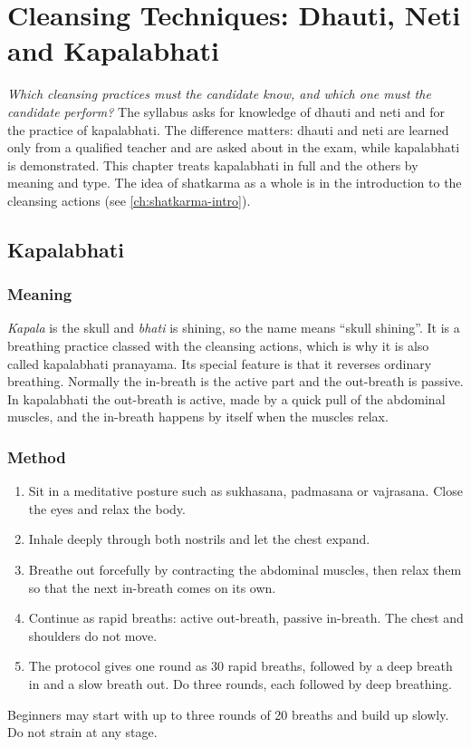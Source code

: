 \chapter{Cleansing Techniques: Dhauti, Neti and Kapalabhati}
\label{ch:cleansing}

\emph{Which cleansing practices must the candidate know, and which one must the candidate perform?}
The syllabus asks for knowledge of dhauti and neti and for the practice of kapalabhati. The difference matters: dhauti and neti are learned only from a qualified teacher and are asked about in the exam, while kapalabhati is demonstrated. This chapter treats kapalabhati in full and the others by meaning and type. The idea of shatkarma as a whole is in the introduction to the cleansing actions (see \cref{ch:shatkarma-intro}).

\section{Kapalabhati}

\subsection*{Meaning}
\emph{Kapala} is the skull and \emph{bhati} is shining, so the name means ``skull shining''. It is a breathing practice classed with the cleansing actions, which is why it is also called kapalabhati pranayama. Its special feature is that it reverses ordinary breathing. Normally the in-breath is the active part and the out-breath is passive. In kapalabhati the out-breath is active, made by a quick pull of the abdominal muscles, and the in-breath happens by itself when the muscles relax.

\subsection*{Method}
\begin{enumerate}
\item Sit in a meditative posture such as sukhasana, padmasana or vajrasana. Close the eyes and relax the body.
\item Inhale deeply through both nostrils and let the chest expand.
\item Breathe out forcefully by contracting the abdominal muscles, then relax them so that the next in-breath comes on its own.
\item Continue as rapid breaths: active out-breath, passive in-breath. The chest and shoulders do not move.
\item The protocol gives one round as 30 rapid breaths, followed by a deep breath in and a slow breath out. Do three rounds, each followed by deep breathing.
\end{enumerate}
Beginners may start with up to three rounds of 20 breaths and build up slowly. Do not strain at any stage.


